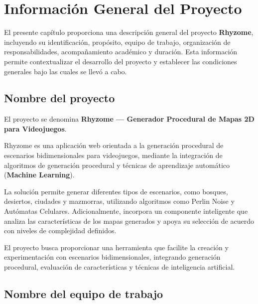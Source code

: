 \chapter{Información General del Proyecto}
\label{cap:01_informacion_general}

El presente capítulo proporciona una descripción general del proyecto \textbf{Rhyzome}, incluyendo su identificación, propósito, equipo de trabajo, organización de responsabilidades, acompañamiento académico y duración. Esta información permite contextualizar el desarrollo del proyecto y establecer las condiciones generales bajo las cuales se llevó a cabo.


\section{Nombre del proyecto}

El proyecto se denomina \textbf{Rhyzome --- Generador Procedural de Mapas 2D para Videojuegos}.

Rhyzome es una aplicación web orientada a la generación procedural de escenarios bidimensionales para videojuegos, mediante la integración de algoritmos de generación procedural y técnicas de aprendizaje automático (\textbf{Machine Learning}).

La solución permite generar diferentes tipos de escenarios, como bosques, desiertos, ciudades y mazmorras, utilizando algoritmos como Perlin Noise y Autómatas Celulares. Adicionalmente, incorpora un componente inteligente que analiza las características de los mapas generados y apoya su selección de acuerdo con niveles de complejidad definidos.

El proyecto busca proporcionar una herramienta que facilite la creación y experimentación con escenarios bidimensionales, integrando generación procedural, evaluación de características y técnicas de inteligencia artificial.


\section{Nombre del equipo de trabajo}

